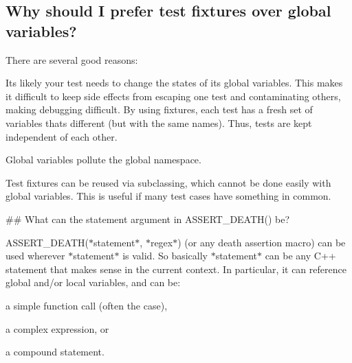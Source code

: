 \begin{DoxyCode}{0}
\end{DoxyCode}


\subsection*{Why should I prefer test fixtures over global variables?}

There are several good reasons\+:


\begin{DoxyEnumerate}
\item It\textquotesingle{}s likely your test needs to change the states of its global variables. This makes it difficult to keep side effects from escaping one test and contaminating others, making debugging difficult. By using fixtures, each test has a fresh set of variables that\textquotesingle{}s different (but with the same names). Thus, tests are kept independent of each other.
\end{DoxyEnumerate}
\begin{DoxyEnumerate}
\item Global variables pollute the global namespace.
\end{DoxyEnumerate}
\begin{DoxyEnumerate}
\item Test fixtures can be reused via subclassing, which cannot be done easily with global variables. This is useful if many test cases have something in common.
\end{DoxyEnumerate}

\begin{DoxyVerb}## What can the statement argument in ASSERT_DEATH() be?
\end{DoxyVerb}


{\ttfamily A\+S\+S\+E\+R\+T\+\_\+\+D\+E\+A\+T\+H($\ast$statement$\ast$, $\ast$regex$\ast$)} (or any death assertion macro) can be used wherever {\ttfamily $\ast$statement$\ast$} is valid. So basically {\ttfamily $\ast$statement$\ast$} can be any C++ statement that makes sense in the current context. In particular, it can reference global and/or local variables, and can be\+:


\begin{DoxyItemize}
\item a simple function call (often the case),
\item a complex expression, or
\item a compound statement.
\end{DoxyItemize}

